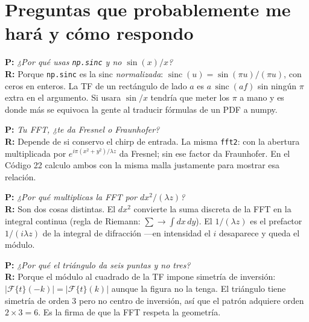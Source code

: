 \documentclass[11pt,a4paper]{article}
\newcommand{\sinc}{\operatorname{sinc}}
\newcommand{\Fou}{\mathcal{F}}
\begin{document}
\section{Preguntas que probablemente me hará y cómo respondo}

\begin{pregunta}
\textcolor{rojo}{\textbf{P:}} \emph{¿Por qué usas \texttt{np.sinc} y no
$\sin(x)/x$?}\\
\textbf{R:} Porque \texttt{np.sinc} es la sinc \emph{normalizada}:
$\sinc(u)=\sin(\pi u)/(\pi u)$, con ceros en enteros. La TF de un rectángulo de
lado $a$ es $a\,\sinc(af)$ sin ningún $\pi$ extra en el argumento. Si usara
$\sin/x$ tendría que meter los $\pi$ a mano y es donde más se equivoca la gente al
traducir fórmulas de un PDF a numpy.
\end{pregunta}

\begin{pregunta}
\textcolor{rojo}{\textbf{P:}} \emph{Tu FFT, ¿te da Fresnel o Fraunhofer?}\\
\textbf{R:} Depende de si conservo el chirp de entrada. La misma \texttt{fft2}:
con la abertura multiplicada por $e^{i\pi(x^2+y^2)/\lambda z}$ da Fresnel; sin ese
factor da Fraunhofer. En el Código 22 calculo ambos con la misma malla justamente
para mostrar esa relación.
\end{pregunta}

\begin{pregunta}
\textcolor{rojo}{\textbf{P:}} \emph{¿Por qué multiplicas la FFT por
$dx^2/(\lambda z)$?}\\
\textbf{R:} Son dos cosas distintas. El $dx^2$ convierte la suma discreta de la FFT
en la integral continua (regla de Riemann: $\sum\to\int dx\,dy$). El $1/(\lambda z)$
es el prefactor $1/(i\lambda z)$ de la integral de difracción ---en intensidad el
$i$ desaparece y queda el módulo.
\end{pregunta}

\begin{pregunta}
\textcolor{rojo}{\textbf{P:}} \emph{¿Por qué el triángulo da seis puntas y no tres?}\\
\textbf{R:} Porque el módulo al cuadrado de la TF impone simetría de inversión:
$|\Fou\{t\}(-k)|=|\Fou\{t\}(k)|$ aunque la figura no la tenga. El triángulo tiene
simetría de orden 3 pero no centro de inversión, así que el patrón adquiere orden
$2\times3=6$. Es la firma de que la FFT respeta la geometría.
\end{pregunta}
\end{document}
